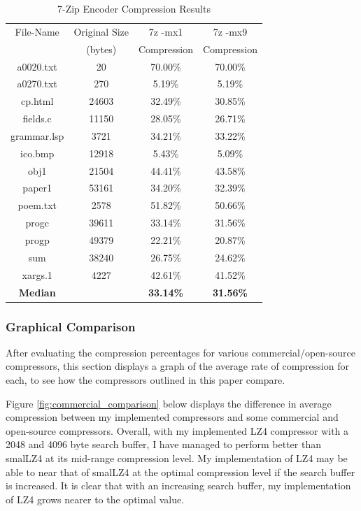 \documentclass[12pt]{article}
\begin{document}
\begin{table}[H]
	\centering
	\begin{tabular}{| c | c | c | c |} 
		\hline
		File-Name & Original Size & 7z -mx1 & 7z -mx9\\
		& (bytes) & Compression & Compression\\
		\hline
		a0020.txt & 20 & 70.00\% & 70.00\%\\
		\hline
		a0270.txt & 270 & 5.19\% & 5.19\%\\
		\hline
		cp.html & 24603 & 32.49\% & 30.85\%\\
		\hline
		fields.c & 11150 & 28.05\% & 26.71\%\\
		\hline
		grammar.lsp & 3721 & 34.21\% & 33.22\%\\
		\hline
		ico.bmp & 12918 & 5.43\% & 5.09\%\\
		\hline
		obj1 & 21504 & 44.41\% & 43.58\%\\
		\hline
		paper1 & 53161 & 34.20\% & 32.39\%\\
		\hline
		poem.txt & 2578 & 51.82\% & 50.66\%\\
		\hline
		progc & 39611 & 33.14\% & 31.56\%\\
		\hline
		progp & 49379 & 22.21\% & 20.87\%\\
		\hline
		sum & 38240 & 26.75\% & 24.62\%\\
		\hline
		xargs.1 & 4227 & 42.61\% & 41.52\%\\
		\Xhline{3\arrayrulewidth}
		\textbf{Median} & & \textbf{33.14\%} & \textbf{31.56\%}\\
		\hline
	\end{tabular}
	\caption{7-Zip Encoder Compression Results}
	\label{7z_results_compression}
\end{table}

\subsubsection{Graphical Comparison}
After evaluating the compression percentages for various commercial/open-source compressors, this section displays a graph of the average rate of compression for each, to see how the compressors outlined in this paper compare.

Figure \ref{fig:commercial_comparison} below displays the difference in average compression between my implemented compressors and some commercial and open-source compressors. Overall, with my implemented LZ4 compressor with a 2048 and 4096 byte search buffer, I have managed to perform better than smalLZ4 at its mid-range compression level. My implementation of LZ4 may be able to near that of smalLZ4 at the optimal compression level if the search buffer is increased. It is clear that with an increasing search buffer, my implementation of LZ4 grows nearer to the optimal value.
\end{document}
